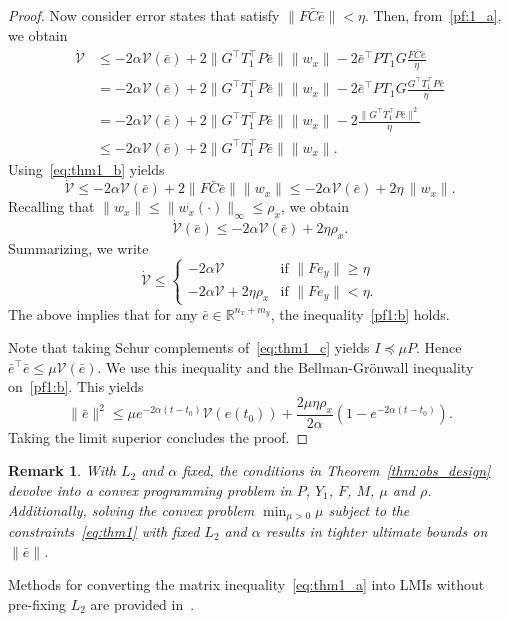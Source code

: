 \documentclass[times, doublespace]{rncauth}
\newtheorem{remark}{Remark}
\begin{document}
\begin{proof}
	Now consider error states that satisfy $\|F\bar C\bar e\|<\eta$. Then, from~\eqref{pf:1_a}, we obtain
	\begin{align*}
	\dot{\mathcal V} &\le -2\alpha\mathcal V(\bar e) + 2\|G^\top T_1^\top P\bar e\|\|w_x\|-2\bar e^\top PT_1G\frac{F\bar C\bar e}{\eta}\\
	&=-2\alpha\mathcal V(\bar e) + 2\|G^\top T_1^\top P\bar e\|\|w_x\|-2\bar e^\top PT_1G\frac{G^\top T_1^\top P\bar e}{\eta}\\
	&= -2\alpha\mathcal V(\bar e) + 2\|G^\top T_1^\top P\bar e\|\|w_x\|-2\frac{\|G^\top T_1^\top P\bar e\|^2}{\eta}\\
	&\le -2\alpha\mathcal V(\bar e) + 2\|G^\top T_1^\top P\bar e\|\|w_x\|.
	\end{align*}
Using~\eqref{eq:thm1_b} yields
	\[
	\dot{\mathcal V}\le -2\alpha\mathcal V(\bar e) + 2\|F\bar C\bar e\|\|w_x\| \le -2\alpha\mathcal V(\bar e) + 2\eta\,\|w_x\|.
	\] 
	Recalling that $\|w_x\|\le \|w_x(\cdot)\|_\infty\le \rho_x$, we obtain
	\begin{equation}\label{pf1:b}
	\dot{\mathcal{V}}(\bar e)\le -2\alpha\mathcal V(\bar e) + 2\eta\rho_x.
	\end{equation}
	Summarizing, we write
	\begin{equation*}
	\dot{\mathcal V} \le \begin{cases}
	-2\alpha\mathcal V & \text{if $\|Fe_y\|\ge \eta$}\\
	-2\alpha\mathcal V + 2\eta\rho_x & \text{if $\|Fe_y\|<\eta$}.
	\end{cases}
	\end{equation*}
	The above implies that for any $\bar e\in\mathbb{R}^{n_x+m_y}$, the inequality~\eqref{pf1:b} holds.
	
	Note that taking Schur complements of~\eqref{eq:thm1_c} yields $I\preceq \mu P $. Hence $\bar e^\top \bar e\le \mu\mathcal V(\bar e)$. We use this inequality and the Bellman-Gr\"onwall inequality on~\eqref{pf1:b}. This yields
	\begin{equation*}
	\|\bar e\|^2 \le \mu e^{-2\alpha(t-t_0)}\mathcal V(e(t_0)) + \frac{2\mu\eta\rho_x}{2\alpha} \left(1 - e^{-2\alpha(t-t_0)}\right).
	\end{equation*}
	Taking the limit superior concludes the proof.
\end{proof}
\begin{remark}
With $L_2$ and $\alpha$ fixed, the conditions in Theorem~\ref{thm:obs_design} devolve into a convex programming problem in $P$, $Y_1$, $F$, $M$, $\mu$ and $\rho$. Additionally, solving the convex problem $\min_{\mu>0}\mu$ subject to the constraints~\eqref{eq:thm1} with fixed $L_2$ and $\alpha$ results in tighter ultimate bounds on $\|\bar e\|$.
\end{remark}
Methods for converting the matrix inequality~\eqref{eq:thm1_a} into LMIs without pre-fixing $L_2$ are provided in~\cite{acikmese11obs}.
	
\end{document}
